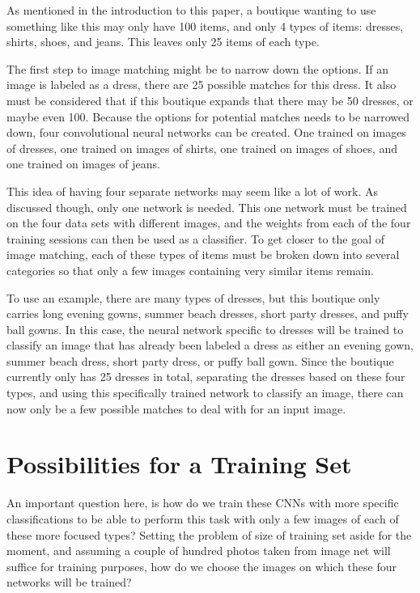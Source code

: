 \documentclass[12pt]{report} %
\begin{document}
	As mentioned in the introduction to this paper, a boutique wanting to use something like this may only have 100 items, and only 4 types of items: dresses, shirts, shoes, and jeans. This leaves only 25 items of each type. 
	
	The first step to image matching might be to narrow down the options. If an image is labeled as a dress, there are 25 possible matches for this dress. It also must be considered that if this boutique expands that there may be 50 dresses, or maybe even 100.  Because the options for potential matches needs to be narrowed down, four convolutional neural networks can be created. One trained on images of dresses, one trained on images of shirts, one trained on images of shoes, and one trained on images of jeans.
	
	This idea of having four separate networks may seem like a lot of work. As discussed though, only one network is needed. This one network must be trained on the four data sets with different images, and the weights from each of the four training sessions can then be used as a classifier. To get closer to the goal of image matching, each of these types of items must be broken down into several categories so that only a few images containing very similar items remain. 
	
	To use an example, there are many types of dresses, but this boutique only carries long evening gowns, summer beach dresses, short party dresses, and puffy ball gowns. In this case, the neural network specific to dresses will be trained to classify an image that has already been labeled a dress as either an evening gown, summer beach dress, short party dress, or puffy ball gown. Since the boutique currently only has 25 dresses in total, separating the dresses based on these four types, and using this specifically trained network to classify an image, there can now only be a few possible matches to deal with for an input image. 
\section{Possibilities for a Training Set}
	
	An important question here, is how do we train these CNNs with more specific classifications to be able to perform this task with only a few images of each of these more focused types? Setting the problem of size of training set aside for the moment, and assuming a couple of hundred photos taken from image net will suffice for training purposes, how do we choose the images on which these four networks will be trained?
	
\end{document}
